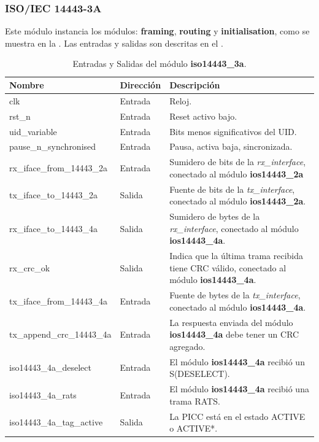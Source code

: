 \documentclass[a4paper, twoside, 11pt]{report}
\begin{document}
\FloatBarrier
\subsubsection{ISO/IEC 14443-3A}

Este módulo instancia los módulos: \textbf{framing}, \textbf{routing} y \textbf{initialisation}, como se muestra en la . Las entradas y salidas son descritas en el .

\begin{table}[htb]
  \centering
  \tablezebra
  \begin{tabulary}{\linewidth}{l|l|L}
    \setcounter{rownum}{0}
    \textbf{Nombre}&\textbf{Dirección}&\textbf{Descripción} \\
    \hline
    clk&Entrada&Reloj. \\
    rst\_n&Entrada&Reset activo bajo. \\
    uid\_variable&Entrada&Bits menos significativos del UID. \\
    pause\_n\_synchronised&Entrada&Pausa, activa baja, sincronizada. \\
    rx\_iface\_from\_14443\_2a&Entrada&Sumidero de bits de la \textit{rx\_interface}, conectado al módulo \textbf{ios14443\_2a} \\
    tx\_iface\_to\_14443\_2a&Salida&Fuente de bits de la \textit{tx\_interface}, conectado al módulo \textbf{ios14443\_2a}. \\
    rx\_iface\_to\_14443\_4a&Salida&Sumidero de bytes de la \textit{rx\_interface}, conectado al módulo \textbf{ios14443\_4a}. \\
    rx\_crc\_ok&Salida&Indica que la última trama recibida tiene CRC válido, conectado al módulo \textbf{ios14443\_4a}. \\
    tx\_iface\_from\_14443\_4a&Entrada&Fuente de bytes de la \textit{tx\_interface}, conectado al módulo \textbf{ios14443\_4a}. \\
    tx\_append\_crc\_14443\_4a&Entrada&La respuesta enviada del módulo \textbf{ios14443\_4a} debe tener un CRC agregado. \\
    iso14443\_4a\_deselect&Entrada&El módulo \textbf{ios14443\_4a} recibió un S(DESELECT). \\
    iso14443\_4a\_rats&Entrada&El módulo \textbf{ios14443\_4a} recibió una trama RATS. \\
    iso14443\_4a\_tag\_active&Salida&La PICC está en el estado ACTIVE o ACTIVE*. \\
  \end{tabulary}
  \caption{Entradas y Salidas del módulo \textbf{iso14443\_3a}.}
  \label{tab:ports_iso14443_3a}
\end{table}
\end{document}
